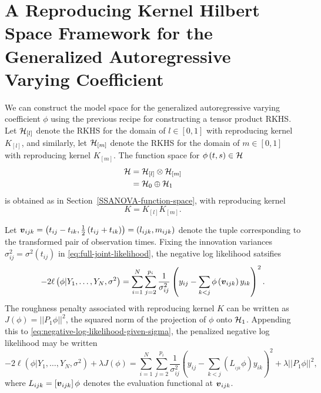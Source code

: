 
\section{A Reproducing Kernel Hilbert Space Framework for the Generalized Autoregressive Varying Coefficient} \label{RKHS-for-phi}

We can construct the model space for the generalized autoregressive varying coefficient $\phi$ using the previous recipe for constructing a tensor product RKHS. Let $\mathcal{H}_{\left[l\right]}$ denote the RKHS for the domain of $l \in \left[0,1\right]$ with reproducing kernel $K_{\left[l\right]}$, and similarly, let $\mathcal{H}_{\left[m\right]}$ denote the RKHS for the domain of $m \in \left[0,1\right]$ with reproducing kernel $K_{\left[m\right]}$. The function space for $\phi\left(t,s\right) \in \mathcal{H}$
\begin{align*}
\mathcal{H} &= \mathcal{H}_{\left[l\right]} \otimes \mathcal{H}_{\left[m\right]} \\
&= \mathcal{H}_0 \oplus \mathcal{H}_1
\end{align*}
\noindent
is obtained as in Section~\ref{SSANOVA-function-space}, with reproducing kernel
\[
K = K_{\left[l\right]}K_{\left[m\right]}.
\] 


Let $\mbox{\boldmath $v$}_{ijk} = \left(t_{ij} - t_{ik}, \frac{1}{2}\left(t_{ij} + t_{ik}\right)\right) = \left(l_{ijk}, m_{ijk}\right)$ denote the tuple corresponding to the transformed pair of observation times. Fixing the innovation variances $\sigma_{ij}^2 = \sigma^2\left(t_{ij}\right)$ in \eqref{eq:full-joint-likelihood}, the negative log likelihood satsifies
\begin{equation}\label{eq:negative-log-likelihood-given-sigma}
-2\ell\left(\phi \vert Y_1,\dots, Y_N, \sigma^2\right) = \sum_{i=1}^N \sum_{j=2}^{p_i} \frac{1}{\sigma^{2}_{ij}}\left( y_{ij} - \sum_{k<j} \phi\left(\mbox{\boldmath $v$}_{ijk}\right) y_{ik}  \right)^2.
\end{equation}
\noindent
The roughness penalty associated with reproducing kernel $K$ can be written as $J\left(\phi\right) =\vert \vert P_1 \phi \vert\vert^2$, the squared norm of the projection of $\phi$ onto $\mathcal{H}_1$. Appending this to \eqref{eq:negative-log-likelihood-given-sigma}, the penalized negative log likelihood may be written
 \begin{equation} \label{eq:phi-penalized-sums-of-squares}
-2\ell\left(\phi \vert Y_1,\dots, Y_N, \sigma^2\right) + \lambda J\left(\phi\right) = \sum_{i=1}^N \sum_{j=2}^{p_i} \frac{1}{\sigma^{2}_{ij}}\left( y_{ij} - \sum_{k<j}\left( L_{_{ijk}}\phi\right) y_{ik}  \right)^2 + \lambda \vert\vert P_1 \phi \vert \vert^2, 
\end{equation} 
\noindent
where $L_{ijk} = \left[\mbox{\boldmath $v$}_{ijk}\right]\phi$ denotes the evaluation functional at $\mbox{\boldmath $v$}_{ijk}$.

